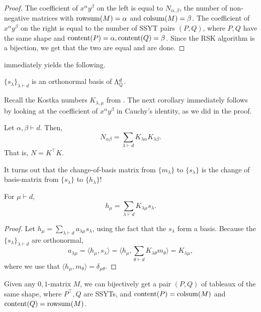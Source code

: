 	\begin{proof}
		The coefficient of $x^\alpha y^\beta$ on the left is equal to $N_{\alpha,\beta}$, the number of non-negative matrices with $\operatorname{rowsum}(M) = \alpha$ and $\operatorname{colsum}(M) = \beta$.  The coefficient of $x^\alpha y^\beta$ on the right is equal to the number of SSYT pairs $(P,Q)$, where $P,Q$ have the same shape and $\operatorname{content}(P) = \alpha, \operatorname{content}(Q) = \beta$. Since the RSK algorithm is a bijection, we get that the two are equal and are done.
	\end{proof}

	 immediately yields the following.

	\begin{fcor}
		$\{s_\lambda\}_{\lambda \vdash d}$ is an orthonormal basis of $\Lambda^d_{\mathbb{Q}}$.
	\end{fcor}

	Recall the Kostka numbers $K_{\lambda,\mu}$ from . The next corollary immediately follows by looking at the coefficient of $x^\alpha y^\beta$ in Cauchy's identity, as we did in the proof.

	\begin{fcor}
		Let $\alpha,\beta \vdash d$. Then,
		\[ N_{\alpha\beta} = \sum_{\lambda \vdash d} K_{\lambda\alpha} K_{\lambda \beta}. \]
		That is, $N = K^\top K$.
	\end{fcor}

	It turns out that the change-of-basis matrix from $\{m_\lambda\}$ to $\{s_\lambda\}$ is the change of basis-matrix from $\{s_\lambda\}$ to $\{h_\lambda\}$!

	\begin{fcor}
		For $\mu \vdash d$,
		\[ h_\mu = \sum_{\lambda \vdash d} K_{\lambda\mu} s_\lambda. \]
	\end{fcor}
	\begin{proof}
		Let $h_\mu = \sum_{\lambda \vdash d} a_{\lambda\mu} s_\lambda$, using the fact that the $s_\lambda$ form a basis. Because the $\{s_\lambda\}_{\lambda \vdash d}$ are orthonormal,
		\[ a_{\lambda\mu} = \langle h_\mu , s_\lambda \rangle = \langle  h_\mu , \sum_{\theta \vdash d} K_{\lambda\theta} m_\theta \rangle = K_{\lambda\mu}, \]
		where we use that $\langle h_\mu,m_\theta\rangle = \delta_{\mu\theta}$.
	\end{proof}

	\begin{ftheo}
		Given any $0,1$-matrix $M$, we can bijectively get a pair $(P,Q)$ of tableaux of the same shape, where $P^\top, Q$ are SSYTs, and $\operatorname{content}(P) = \operatorname{colsum}(M)$ and $\operatorname{content}(Q) = \operatorname{rowsum}(M)$.  
	\end{ftheo}

